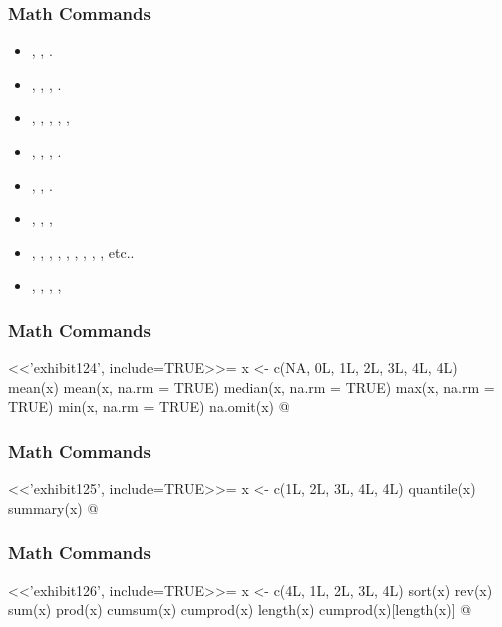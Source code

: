 \begin{frame}[fragile]
\frametitle{\Rlogo Math Commands}
\begin{itemize}
\item {}, , .
\item {}, , , .
\item {}, , , , , 
\item {}, , , . 
\item {}, , .
\item {}, , , 
\item {}, , , , , , , , , etc..
\item {}, , , , 
\end{itemize}
\end{frame}


\begin{frame}[fragile]%
\frametitle{Math Commands}
<<'exhibit124', include=TRUE>>=
  x <- c(NA, 0L, 1L, 2L, 3L, 4L, 4L)
  mean(x)
  mean(x, na.rm = TRUE)
  median(x, na.rm = TRUE)
  max(x, na.rm = TRUE)
  min(x, na.rm = TRUE)
  na.omit(x)
@
\end{frame}


\begin{frame}[fragile]%
\frametitle{Math Commands}
<<'exhibit125', include=TRUE>>=
  x <- c(1L, 2L, 3L, 4L, 4L)
  quantile(x)
  summary(x)
@
\end{frame}


\begin{frame}[fragile]%
\frametitle{Math Commands}
<<'exhibit126', include=TRUE>>=
  x <- c(4L, 1L, 2L, 3L, 4L)
  sort(x)
  rev(x)
  sum(x)
  prod(x)
  cumsum(x)
  cumprod(x)
  length(x)
  cumprod(x)[length(x)]
@
\end{frame}



